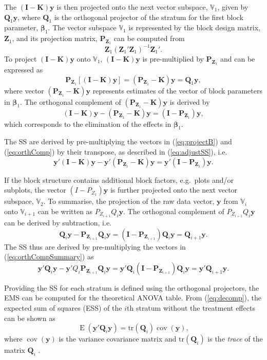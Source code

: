 \documentclass[article]{jss}
\newcommand{\mP}{\mathbf{P}}
\newcommand{\I}{\mathbf{I}}
\newcommand{\K}{\mathbf{K}}
\newcommand{\Z}{\mathbf{Z}}
\newcommand{\Q}{\mathbf{Q}}
\begin{document}
The $(\I-\K)\bm{y}$ is then projected onto the next vector subspace, $\mathbb{V}_1$, given by $\Q_{1}\bm{y}$, where $\Q_{1}$ is the orthogonal projector of the stratum for the first block parameter, $\bm{\beta}_1$. The vector subspace $\mathbb{V}_1$ is represented by the block design matrix, $\Z_1$, and its projection matrix, $\mP_{\Z_1}$ can be computed from 
\[\Z_1(\Z_1'\Z_1)^{-1}\Z_1'.\] 
To project $(\I-\K)\bm{y}$ onto $\mathbb{V}_1$, $(\I-\K)\bm{y}$ is pre-multiplied by $\mP_{\Z_1}$ and can be expressed as
\begin{equation}\label{eq:projectB}
\mP_{\Z_1}[(\I-\K)\bm{y}] = (\mP_{\Z_1} - \K)\bm{y} = \Q_{1}\bm{y},
\end{equation}
where vector $(\mP_{\Z_1} - \K)\bm{y}$ represents estimates of the vector of block parameters in $\bm{\beta}_1$. The orthogonal complement of $(\mP_{\Z_1} - \K)\bm{y}$ is derived by
\begin{equation}
\label{eq:orthComp}
(\I-\K)\bm{y}- (\mP_{\Z_1} - \K)\bm{y} = (\I -\mP_{\Z_1})\bm{y},
\end{equation}
which corresponds to the elimination of the effects in $\bm{\beta}_1$. 

The SS are derived by pre-multiplying the vectors in (\ref{eq:projectB}) and (\ref{eq:orthComp}) by their transpose, as described in (\ref{eq:adjustSS}), i.e.\ 
\[
\bm{y}'(\I-\K)\bm{y}- \bm{y}'(\mP_{\Z_1} - \K)\bm{y} = \bm{y}'(\I -\mP_{\Z_1})\bm{y}.
\]

If the block structure contains additional block factors, e.g.\ plots and/or subplots, the vector $(I - P_{Z_1})\bm{y}$ is further projected onto the next vector subspace, $\mathbb{V}_2$. To summarise, the projection of the raw data vector, $\bm{y}$ from $\mathbb{V}_{i}$ onto $\mathbb{V}_{i + 1}$ can be written as $P_{Z_{i+1}}Q_{i}\bm{y}$. The orthogonal complement of $P_{Z_{i+1}}Q_{i}\bm{y}$ can be derived by subtraction, i.e.\
\begin{equation}
\label{eq:orthCompSummary}
\Q_{i}\bm{y}- \mP_{\Z_{i+1}}\Q_{i}\bm{y} = (\I -\mP_{\Z_{i+1}})\Q_{i}\bm{y} = \Q_{i+ 1}\bm{y}.
\end{equation}
The SS thus are derived by pre-multiplying the vectors in (\ref{eq:orthCompSummary}) as 
\[
\bm{y}'\Q_{i}\bm{y}- \bm{y}'Q_{i}\mP_{\Z_{i+1}}\Q_{i}\bm{y} = \bm{y}'\Q_{i}(\I -\mP_{\Z_{i+1}})\Q_{i}\bm{y}=\bm{y}'\Q_{i+ 1}\bm{y}.
\]

Providing the SS for each stratum is defined using the orthogonal projectors, the EMS can be computed for the theoretical ANOVA table. From (\ref{eq:decomp}), the expected sum of squares (ESS) of the $i$th stratum without the treatment effects can be shown as
\begin{equation}
\label{eq:ESSQuad}
\operatorname{E}(\bm{y}'\Q_i\bm{y})= \mathrm{tr}(\Q_i)\operatorname{cov}(\bm{y}),
\end{equation}
where $\operatorname{cov}(\bm{y})$ is the variance covariance matrix and $\mathrm{tr}(\Q_i)$ is the \emph{trace} of the matrix $\Q_i$ \citep{Searle1982}. 
\end{document}
